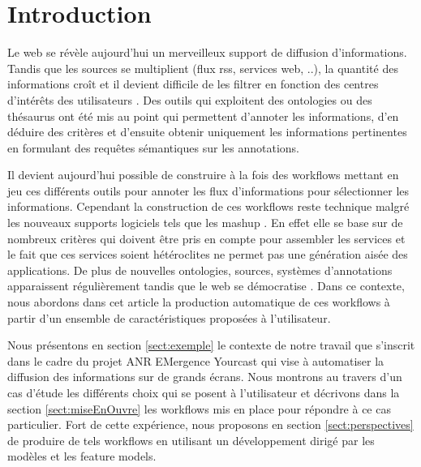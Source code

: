 \documentclass[]{easychair}
\newcommand{\comment}[4]{\par\noindent\hspace*{-0.5cm}{\parbox{\columnwidth}{\textbf{\color{#1}//#2[#3]:#4}}}\par}
\newcommand{\mi}[1]{\comment{blue}{}{#1}{MI}}
\begin{document}


\section{Introduction}
\label{sect:introduction}

Le web se révèle aujourd'hui un merveilleux support de diffusion d'informations. Tandis que les sources se multiplient (flux rss, services web, ..), la quantité des informations croît et il devient difficile de les filtrer en fonction des centres d'intérêts des utilisateurs \cite{Bouzeghoub2005}. Des outils qui exploitent des ontologies ou des thésaurus ont été mis au point qui permettent d'annoter les informations, d'en déduire des critères et d'ensuite obtenir uniquement les informations pertinentes en formulant des requêtes sémantiques sur les annotations. 

Il devient aujourd'hui possible de construire à la fois des workflows mettant en jeu ces différents outils pour annoter les flux d'informations pour sélectionner les informations. 
Cependant la construction de ces workflows reste technique malgré les nouveaux supports logiciels tels que les mashup \cite{Floyd2007} \cite{Milanovic2004}. En effet elle se base sur de nombreux critères qui doivent être pris en compte pour assembler les services et le fait que ces services soient hétéroclites ne permet pas une génération aisée des applications. De plus de nouvelles ontologies, sources, systèmes d'annotations apparaissent régulièrement tandis que le web se démocratise \cite{Anderruthy2007} \cite{Bross2010}.
Dans ce contexte, nous abordons dans cet article la production automatique de ces workflows à partir d'un ensemble de caractéristiques proposées à l'utilisateur. 

Nous présentons en section \ref{sect:exemple} le contexte de notre travail que s'inscrit dans le cadre du projet ANR EMergence Yourcast qui vise à automatiser la diffusion des informations sur de grands écrans. Nous montrons au travers d'un cas d'étude les différents choix qui se posent à l'utilisateur et décrivons dans la section \ref{sect:miseEnOuvre} les workflows  mis en place pour répondre à ce cas particulier. Fort de cette expérience, nous proposons en section \ref{sect:perspectives} de produire de tels workflows en utilisant un développement dirigé par les modèles et les feature models. 
\end{document}

